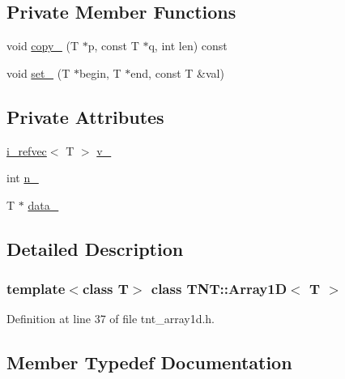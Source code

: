 \subsection*{Private Member Functions}
\begin{DoxyCompactItemize}
\item 
void \hyperlink{classTNT_1_1Array1D_a0467b4a5f2d6ab778913bf1b70523700}{copy\+\_\+} (T $\ast$p, const T $\ast$q, int len) const
\item 
void \hyperlink{classTNT_1_1Array1D_a313ac1ebbd19dcb33c6e9989d50ba517}{set\+\_\+} (T $\ast$begin, T $\ast$end, const T \&val)
\end{DoxyCompactItemize}
\subsection*{Private Attributes}
\begin{DoxyCompactItemize}
\item 
\hyperlink{classTNT_1_1i__refvec}{i\+\_\+refvec}$<$ T $>$ \hyperlink{classTNT_1_1Array1D_a87c970ad54ef696289601c549e2bb1f2}{v\+\_\+}
\item 
int \hyperlink{classTNT_1_1Array1D_a5a3bd03e084859897266908355648fbb}{n\+\_\+}
\item 
T $\ast$ \hyperlink{classTNT_1_1Array1D_adb0ea5432404274e9d831215db7a5c8a}{data\+\_\+}
\end{DoxyCompactItemize}


\subsection{Detailed Description}
\subsubsection*{template$<$class T$>$\newline
class T\+N\+T\+::\+Array1\+D$<$ T $>$}



Definition at line 37 of file tnt\+\_\+array1d.\+h.



\subsection{Member Typedef Documentation}
\mbox{\label{classTNT_1_1Array1D_aa33efada6a804a1b32da0e315baeb29c}} 
